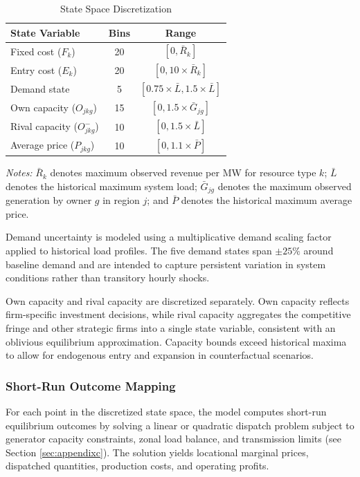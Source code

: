 \documentclass[12pt]{article}
\begin{document}
\begin{table}[htbp]
\centering
\caption{State Space Discretization}
\label{tab:state_space}
\begin{tabular}{lcc}
\toprule
State Variable & Bins & Range \\
\midrule
Fixed cost ($F_k$) & 20 & $[0, \bar{R}_k]$ \\
Entry cost ($E_k$) & 20 & $[0, 10 \times \bar{R}_k]$ \\
Demand state & 5 & $[0.75 \times \bar{L}, 1.5 \times \bar{L}]$ \\
Own capacity ($O_{jkg}$) & 15 & $[0, 1.5 \times \bar{G}_{jg}]$ \\
Rival capacity ($O_{jkg}^-$) & 10 & $[0, 1.5 \times \bar{L}]$ \\
Average price ($P_{jkg}$) & 10 & $[0, 1.1 \times \bar{P}]$ \\
\bottomrule
\end{tabular}
\begin{minipage}{0.9\textwidth}
\vspace{0.5em}
\footnotesize
\textit{Notes:} $\bar{R}_k$ denotes maximum observed revenue per MW for resource type $k$; $\bar{L}$ denotes the historical maximum system load; $\bar{G}_{jg}$ denotes the maximum observed generation by owner $g$ in region $j$; and $\bar{P}$ denotes the historical maximum average price.
\end{minipage}
\end{table}

Demand uncertainty is modeled using a multiplicative demand scaling factor applied to historical load profiles. The five demand states span $\pm 25\%$ around baseline demand and are intended to capture persistent variation in system conditions rather than transitory hourly shocks.

Own capacity and rival capacity are discretized separately. Own capacity reflects firm-specific investment decisions, while rival capacity aggregates the competitive fringe and other strategic firms into a single state variable, consistent with an oblivious equilibrium approximation. Capacity bounds exceed historical maxima to allow for endogenous entry and expansion in counterfactual scenarios.

\subsubsection{Short-Run Outcome Mapping}

For each point in the discretized state space, the model computes short-run equilibrium outcomes by solving a linear or quadratic dispatch problem subject to generator capacity constraints, zonal load balance, and transmission limits (see Section \ref{sec:appendixc}). The solution yields locational marginal prices, dispatched quantities, production costs, and operating profits.
\end{document}
